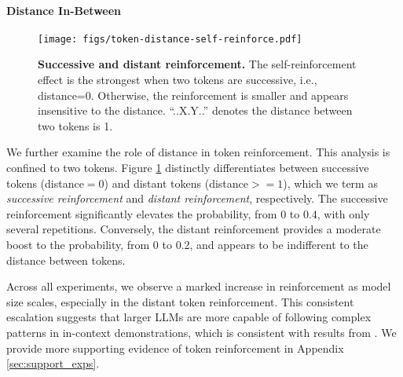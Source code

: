 \documentclass{article} %
\def\elliott#1{{\color{cyan}{\bf [Elliott:} {{#1}}{\bf ]}}}
\begin{document}

\paragraph{Distance In-Between}
\begin{figure}[t!]
  \centering
  \texttt{[image: figs/token-distance-self-reinforce.pdf]}
  \vspace{-15pt}
\caption{\textbf{Successive and distant reinforcement.} The self-reinforcement effect is the strongest when two tokens are successive, i.e., distance=0. Otherwise, the reinforcement is smaller and appears insensitive to the distance. ``..X.Y..'' denotes the distance between two tokens is 1. }
\label{fig:token-distance-reinforce}
\vspace{-15pt}
\end{figure}

We further examine the role of distance in token reinforcement. This analysis is confined to two tokens. Figure \ref{fig:token-distance-reinforce} distinctly differentiates between successive tokens (distance$=0$) and distant tokens (distance$>=1$), which we term as \emph{successive reinforcement} and \emph{distant reinforcement}, respectively.
The successive reinforcement significantly elevates the probability, from 0 to 0.4, with only several repetitions. Conversely, the distant reinforcement provides a moderate boost to the probability, from 0 to 0.2, and appears to be indifferent to the distance between tokens.


Across all experiments, we observe a marked increase in reinforcement as model size scales, especially in the distant token reinforcement. 
This consistent escalation suggests that larger LLMs are more capable of following complex patterns in in-context demonstrations, which is consistent with results from \cite{wei2023larger}. 
We provide more supporting evidence of token reinforcement in Appendix \ref{sec:support_exps}.
\end{document}
